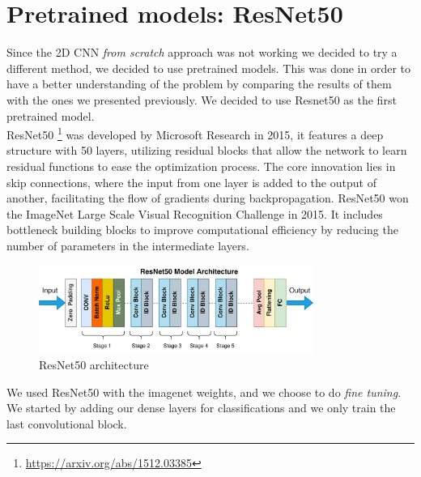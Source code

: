\begin{table}[]
    \centering
    \caption{2D models accuracy and recall}
    \label{tab:2DCNNTable}
\end{table}
\pagebreak
\section{Pretrained models: ResNet50}
Since the 2D CNN \textit{from scratch} approach was not working we decided to try a different method, we decided to use pretrained models. This was done in order to have a better understanding of the problem by comparing the results of them with the ones we presented previously. We decided to use Resnet50 as the first pretrained model. \\

ResNet50 \footnote{\url{https://arxiv.org/abs/1512.03385}} was developed by Microsoft Research in 2015, it features a deep structure with 50 layers, utilizing residual blocks that allow the network to learn residual functions to ease the optimization process.
The core innovation lies in skip connections, where the input from one layer is added to the output of another, facilitating the flow of gradients during backpropagation.
ResNet50  won the ImageNet Large Scale Visual Recognition Challenge in 2015. It includes bottleneck building blocks to improve computational efficiency by reducing the number of parameters in the intermediate layers.
\begin{figure}[]
    \centering
    \includegraphics[width=0.8\textwidth]{images/ResNet50_architecture.png}
    \caption{ResNet50 architecture}
    \label{fig:ResNet50Arch}
\end{figure}
We used ResNet50 with the imagenet weights, and we choose to do 
\textit{fine tuning}. We started by adding our dense layers for classifications and we only train the last convolutional block.  

